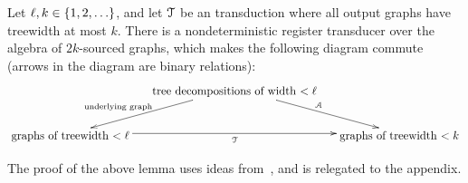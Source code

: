 

\begin{lemma}\label{lem:transduction-to-registers}
    Let $\ell, k \in \{1,2,\ldots\}$, and  let ${\mathcal T}$ be an \mso transduction where all output graphs have treewidth at most $k$. There is a nondeterministic register transducer over the algebra of $2k$-sourced graphs, which makes the following diagram commute (arrows in the diagram are binary relations):
    \begin{align*}
    \xymatrix@C=0.5cm{
         & \txt{tree decompositions of width $< \ell$}
        \ar[dl]_-{\txt{\scriptsize underlying graph \qquad \qquad}}
         \ar[dr]^\Aa\\
        \txt{graphs of treewidth $< \ell$}\ar[rr]_\Tt & &
        \txt{graphs  of treewidth $< k$} 
    }
    \end{align*}
\end{lemma}
The proof of the above lemma uses ideas from~\cite{courcelleMonadicSecondorderLogic1990,bloem_comparison_2000,alurStreamingTreeTransducers2017}, and  is relegated to the appendix.  

